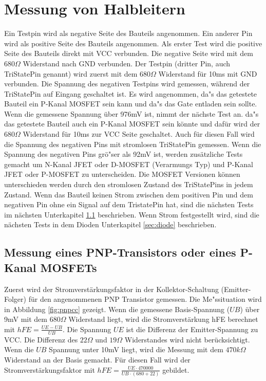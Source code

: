 \section{Messung von Halbleitern}
Ein Testpin wird als negative Seite des Bauteils angenommen.
Ein anderer Pin wird als positive Seite des Bauteils angenommen.
Als erster Test wird die positive Seite des Bauteils direkt mit VCC verbunden.
Die negative Seite wird mit dem \(680\Omega\) Widerstand nach GND verbunden.
Der Testpin (dritter Pin, auch TriStatePin genannt) wird zuerst mit dem \(680\Omega\) Widerstand
f\"ur 10ms mit GND verbunden.
Die Spannung des negativen Testpins wird gemessen, w\"ahrend der TriStatePin auf Eingang
geschaltet ist.
Es wird angenommen, da"s das getestete Bauteil ein P-Kanal MOSFET sein kann und da"s das Gate
entladen sein sollte.
Wenn die gemessene Spannung \"uber 976mV ist, nimmt der n\"achste Test an. da"s das getestete
Bauteil auch ein P-Kanal MOSFET sein k\"onnte und daf\"ur wird der \(680\Omega\) Widerstand
f\"ur 10ms zur VCC Seite geschaltet.
Auch f\"ur diesen Fall wird die Spannung des negativen Pins mit stromlosen TriStatePin gemessen.
Wenn die Spannung des negativen Pins gr\"o"ser als 92mV ist, werden zus\"atzliche Tests gemacht
um N-Kanal JFET oder D-MOSFET (Verarmungs Typ) und P-Kanal JFET oder P-MOSFET zu unterscheiden.
Die MOSFET Versionen k\"onnen unterschieden werden durch den stromlosen Zustand des
TriStatePins in jedem Zustand.
Wenn das Bauteil keinen Strom zwischen dem positiven Pin und dem negativen Pin ohne ein Signal
auf dem TristatePin hat, sind die n\"achsten Tests im n\"achsten Unterkapitel \ref{sec:pnp} beschrieben.
Wenn Strom festgestellt wird, sind die n\"achsten Tests in dem Dioden Unterkapitel \ref{sec:diode} beschrieben.

\subsection{Messung eines PNP-Transistors oder eines P-Kanal MOSFETs}
\label{sec:pnp}
Zuerst wird der Stromverst\"arkungsfaktor in der Kollektor-Schaltung (Emitter-Folger) f\"ur den angenommenen
PNP Transistor gemessen.
Die Me"ssituation wird in Abbildung \ref{fig:pnpcc} gezeigt.
Wenn die gemessene Basis-Spannung (\(UB\)) \"uber 9mV mit dem \(680\Omega\) Widerstand liegt,
wird die Stromverst\"arkung hFE berechnet mit \(hFE = \frac{UE-UB}{UB}\). 
Die Spannung \(UE\) ist die Differenz der Emitter-Spannung zu VCC.
Die Differenz des \(22\Omega\) und \(19\Omega\) Widerstandes wird nicht ber\"ucksichtigt.
Wenn die \(UB\) Spannung unter 10mV liegt, wird die Messung mit dem \(470k\Omega\) Widerstand an der Basis gemacht.
F\"ur diesen Fall wird der Stromverst\"arkungsfaktor mit \(hFE = \frac{UE \cdot 470000}{UB \cdot (680+22)}\) gebildet.

